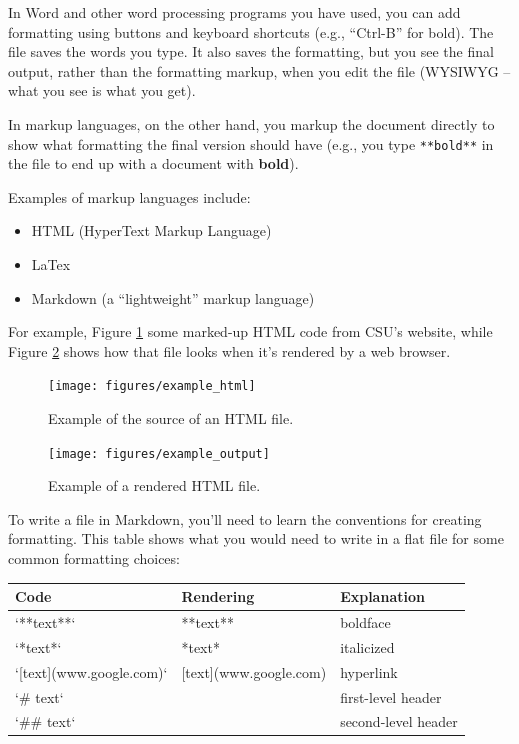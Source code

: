 \documentclass[]{book}
\providecommand{\tightlist}{%
  \setlength{\itemsep}{0pt}\setlength{\parskip}{0pt}}
\begin{document}
In Word and other word processing programs you have used, you can add
formatting using buttons and keyboard shortcuts (e.g., ``Ctrl-B'' for
bold). The file saves the words you type. It also saves the formatting,
but you see the final output, rather than the formatting markup, when
you edit the file (WYSIWYG -- what you see is what you get).

In markup languages, on the other hand, you markup the document directly
to show what formatting the final version should have (e.g., you type
\texttt{**bold**} in the file to end up with a document with
\textbf{bold}).

Examples of markup languages include:

\begin{itemize}
\tightlist
\item
  HTML (HyperText Markup Language)
\item
  LaTex
\item
  Markdown (a ``lightweight'' markup language)
\end{itemize}

For example, Figure \ref{fig:htmlexample} some marked-up HTML code from
CSU's website, while Figure \ref{fig:renderedexample} shows how that
file looks when it's rendered by a web browser.

\begin{figure}

{\centering \texttt{[image: figures/example\_html]} 

}

\caption{Example of the source of an HTML file.}\label{fig:htmlexample}
\end{figure}

\begin{figure}

{\centering \texttt{[image: figures/example\_output]} 

}

\caption{Example of a rendered HTML file.}\label{fig:renderedexample}
\end{figure}

To write a file in Markdown, you'll need to learn the conventions for
creating formatting. This table shows what you would need to write in a
flat file for some common formatting choices:

\begin{tabular}{l|l|l}
\hline
Code & Rendering & Explanation\\
\hline
`**text**` & **text** & boldface\\
\hline
`*text*` & *text* & italicized\\
\hline
`[text](www.google.com)` & [text](www.google.com) & hyperlink\\
\hline
`\# text` &  & first-level header\\
\hline
`\#\# text` &  & second-level header\\
\hline
\end{tabular}
\end{document}
